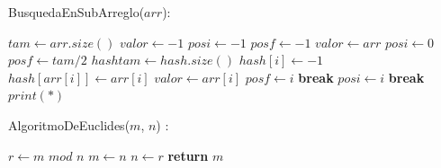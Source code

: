 \documentclass[12pt,twoside]{article}
\begin{document}
\begin{algorithm}
    \caption{BusquedaEnSubArreglo($arr$):}
    \begin{algorithmic}
    \State $tam \gets arr.size()$
    \State $valor \gets -1$
    \State $posi \gets -1$
    \State $posf \gets -1$
        \State $valor \gets arr$
        \State $posi \gets 0$
        \State $posf \gets tam/2$
    \Else
        \State $hashtam \gets hash.size()$
            \State $hash[i] \gets -1$
        \EndFor
                \State $hash[arr[i]] \gets arr[i]$
            \Else
                    \State $valor \gets arr[i]$
                    \State $posf \gets i$
                    \State \textbf{break}
                \EndIf
            \EndIf
        \EndFor
                \State $posi \gets i$
                \State \textbf{break}
            \EndIf
        \EndFor
            \State $print(*)$
        \EndIf
    \EndIf 
    \end{algorithmic}
\end{algorithm}
\newpage
\begin{algorithm}
    \caption{AlgoritmoDeEuclides($m$, $n$) :}
    \begin{algorithmic}
    \State $r \gets m$ $mod$ $n$
    \State $m \gets n$
    \State $n \gets r$
    \EndWhile
    \State \textbf{return} $m$
    \end{algorithmic}
\end{algorithm}
\end{document}
